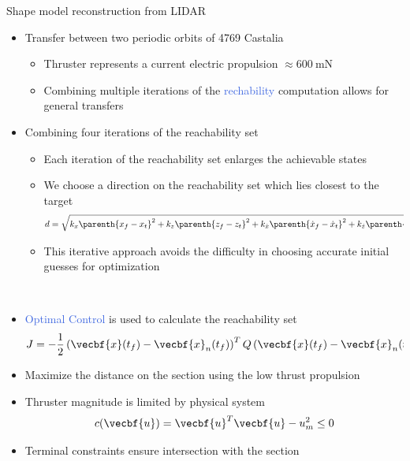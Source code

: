 \documentclass[final, usenames, dvipsnames]{beamer}
\newlength{\twocolwidth}
\def\Emph{\textcolor{RoyalBlue}}
\begin{document}
\begin{frame}[t]
\begin{columns}[T,onlytextwidth]
\begin{column}{\twocolwidth}
\begin{block}{Shape model reconstruction from LIDAR} %
    \begin{minipage}[t]{0.5\columnwidth}
    \begin{itemize}
        \item Transfer between two periodic orbits of 4769 Castalia
        \begin{itemize}
            \item Thruster represents a current electric propulsion \( \approx \SI{600}{\milli\newton}\)
            \item Combining multiple iterations of the \Emph{rechability} computation allows for general transfers
        \end{itemize}
        \item Combining four iterations of the reachability set
        \begin{itemize}
            \item Each iteration of the reachability set enlarges the achievable states
            \item We choose a direction on the reachability set which lies closest to the target
            \[
                d = \sqrt{k_x \parenth{x_f - x_t }^2 + k_z \parenth{z_f - z_t }^2 + k_{\dot{x}}\parenth{\dot{x}_f - \dot{x}_t }^2 + k_{\dot{z}}\parenth{\dot{z}_f - \dot{z}_t }^2}
            \]
            \item This iterative approach avoids the difficulty in choosing accurate initial guesses for optimization
        \end{itemize}
    \end{itemize}
    \end{minipage}~
    \begin{minipage}[t]{0.5\columnwidth}
    \begin{itemize}
        \item \Emph{Optimal Control} is used to calculate the reachability set
            \[
            J = -\frac{1}{2} \left( \vecbf{x}(t_f) - \vecbf{x}_{n}(t_f)\right)^T Q \left( \vecbf{x}(t_f) - \vecbf{x}_{n}(t_f)\right) 
            \]
        \item Maximize the distance on the section using the low thrust propulsion
        \item Thruster magnitude is limited by physical system
        \[
            c(\vecbf{u}) = \vecbf{u}^T \vecbf{u} - u_m^2 \leq 0 
        \]
        \item Terminal constraints ensure intersection with the section

\end{itemize}
\end{minipage}
\end{block}
\end{column}
\end{columns}
\end{frame}
\end{document}
